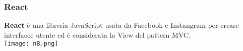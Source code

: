 \begin{frame}
\frametitle{React}
	\par
  	\textbf{React} è una libreria JavaScript usata da Facebook e Instangram per creare interfacce utente ed è considerata la View del pattern MVC.\\
	\centering
  	\texttt{[image: n8.png]}
\end{frame}


